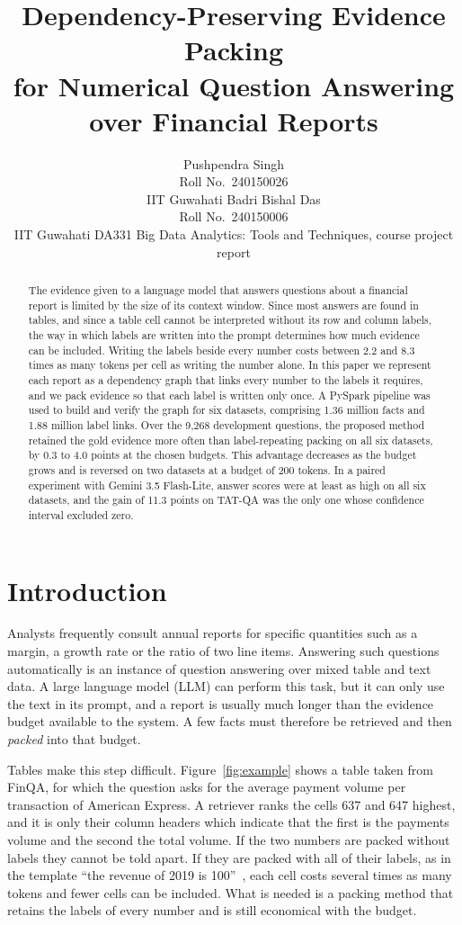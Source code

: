 \documentclass[11pt]{article}
\title{Dependency-Preserving Evidence Packing\\for Numerical Question Answering over Financial Reports}
\author{Pushpendra Singh\\Roll No.\ 240150026\\IIT Guwahati
\And Badri Bishal Das\\Roll No.\ 240150006\\IIT Guwahati
\AND DA331 Big Data Analytics: Tools and Techniques, course project report}
\begin{document}
\maketitle

\begin{abstract}
The evidence given to a language model that answers questions about a financial
report is limited by the size of its context window. Since most answers are found
in tables, and since a table cell cannot be interpreted without its row and column
labels, the way in which labels are written into the prompt determines how much
evidence can be included. Writing the labels beside every number costs between 2.2
and 8.3 times as many tokens per cell as writing the number alone. In this paper we
represent each report as a dependency graph that links every number to the labels it
requires, and we pack evidence so that each label is written only once. A PySpark
pipeline was used to build and verify the graph for six datasets, comprising 1.36
million facts and 1.88 million label links. Over the 9,268 development questions, the
proposed method retained the gold evidence more often than label-repeating packing on
all six datasets, by 0.3 to 4.0 points at the chosen budgets. This advantage decreases
as the budget grows and is reversed on two datasets at a budget of 200 tokens. In a
paired experiment with Gemini 3.5 Flash-Lite, answer scores were at least as high on
all six datasets, and the gain of 11.3 points on TAT-QA was the only one whose
confidence interval excluded zero.
\end{abstract}

\section{Introduction}
Analysts frequently consult annual reports for specific quantities such as a margin,
a growth rate or the ratio of two line items. Answering such questions automatically
is an instance of question answering over mixed table and text data. A large language
model (LLM) can perform this task, but it can only use the text in its prompt, and a
report is usually much longer than the evidence budget available to the system. A few
facts must therefore be retrieved and then \emph{packed} into that budget.

Tables make this step difficult. Figure~\ref{fig:example} shows a table taken from
FinQA, for which the question asks for the average payment volume per transaction of
American Express. A retriever ranks the cells 637 and 647 highest, and it is only
their column headers which indicate that the first is the payments volume and the
second the total volume. If the two numbers are packed without labels they cannot be
told apart. If they are packed with all of their labels, as in the template ``the
revenue of 2019 is 100''~\citep{finqa,arun2023}, each cell costs several times as many
tokens and fewer cells can be included. What is needed is a packing method that
retains the labels of every number and is still economical with the budget.
\end{document}
